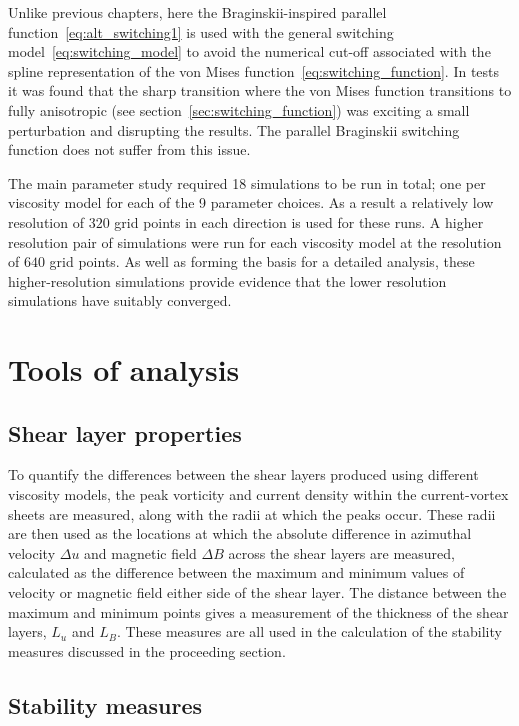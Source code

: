 Unlike previous chapters, here the Braginskii-inspired parallel function~\ref{eq:alt_switching1} is used with the general switching model~\ref{eq:switching_model} to avoid the numerical cut-off associated with the spline representation of the von Mises function~\ref{eq:switching_function}. In tests it was found that the sharp transition where the von Mises function transitions to fully anisotropic (see section~\ref{sec:switching_function}) was exciting a small perturbation and disrupting the results. The parallel Braginskii switching function does not suffer from this issue.

The main parameter study required 18 simulations to be run in total; one per viscosity model for each of the 9 parameter choices. As a result a relatively low resolution of $320$ grid points in each direction is used for these runs. A higher resolution pair of simulations were run for each viscosity model at the resolution of $640$ grid points. As well as forming the basis for a detailed analysis, these higher-resolution simulations provide evidence that the lower resolution simulations have suitably converged.

\section{Tools of analysis}

\label{sec:khi_analysis}

\subsection{Shear layer properties}

To quantify the differences between the shear layers produced using different viscosity models, the peak vorticity and current density within the current-vortex sheets are measured, along with the radii at which the peaks occur. These radii are then used as the locations at which the absolute difference in azimuthal velocity $\Delta u$ and magnetic field $\Delta B$ across the shear layers are measured, calculated as the difference between the maximum and minimum values of velocity or magnetic field either side of the shear layer. The distance between the maximum and minimum points gives a measurement of the thickness of the shear layers, $L_u$ and $L_B$. These measures are all used in the calculation of the stability measures discussed in the proceeding section.

\subsection{Stability measures}

